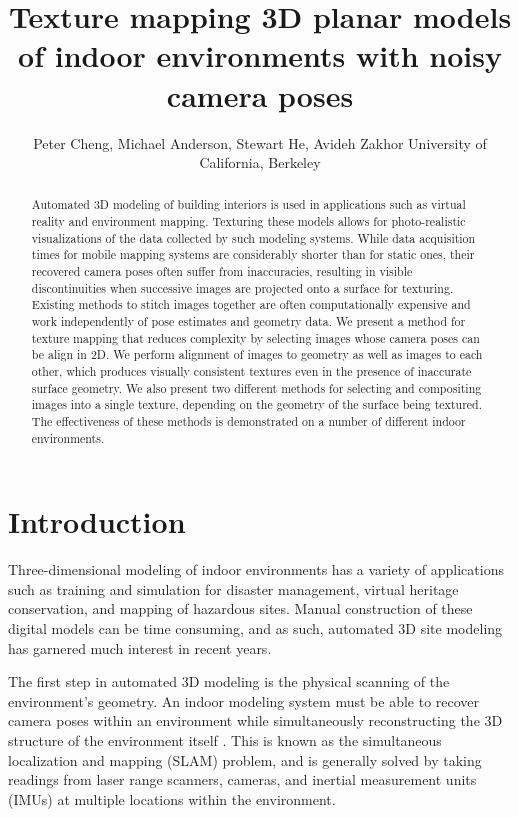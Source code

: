 \documentclass[]{spie}  %
\title{Texture mapping 3D planar models of indoor environments with noisy camera poses}
\author{Peter Cheng, Michael Anderson, Stewart He, Avideh Zakhor
\skiplinehalf
University of California, Berkeley\\
}
\begin{document}
\maketitle

\begin{abstract}
  Automated 3D modeling of building interiors is used in applications
  such as virtual reality and environment mapping. Texturing these
  models allows for photo-realistic visualizations of the data
  collected by such modeling systems. While data acquisition times for
  mobile mapping systems are considerably shorter than for static
  ones, their recovered camera poses often suffer from inaccuracies,
  resulting in visible discontinuities when successive images are
  projected onto a surface for texturing. Existing methods to stitch
  images together are often computationally expensive and work
  independently of pose estimates and geometry data. We present a
  method for texture mapping that reduces complexity by selecting
  images whose camera poses can be align in 2D. We perform alignment
  of images to geometry as well as images to each other, which
  produces visually consistent textures even in the presence of
  inaccurate surface geometry. We also present two different methods
  for selecting and compositing images into a single texture,
  depending on the geometry of the surface being textured. The
  effectiveness of these methods is demonstrated on a number of different
  indoor environments.
\end{abstract}



\section{Introduction}
\label{sec:introduction} %
Three-dimensional modeling of indoor environments has a variety of
applications such as training and simulation for disaster management,
virtual heritage conservation, and mapping of hazardous sites. Manual
construction of these digital models can be time consuming, and as
such, automated 3D site modeling has garnered much interest in recent
years.

The first step in automated 3D modeling is the physical scanning of
the environment's geometry. An indoor modeling system must be able to
recover camera poses within an environment while simultaneously
reconstructing the 3D structure of the environment itself
\cite{chen2010indoor, hz, kua2012loopclosure, liu2010indoor}. This is
known as the simultaneous localization and mapping (SLAM) problem, and
is generally solved by taking readings from laser range scanners,
cameras, and inertial measurement units (IMUs) at multiple locations
within the environment.
\end{document}
